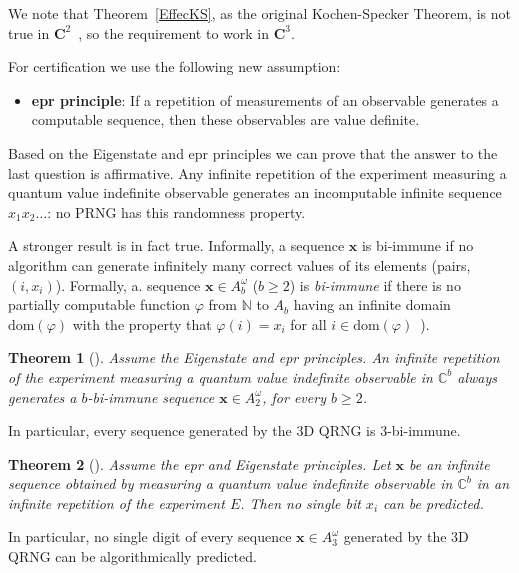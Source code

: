 \documentclass[11pt,a4paper]{article}
\newtheorem{theorem}{Theorem}
\newcommand{\bbbn}{\mathbb{N}}
\newcommand{\dom}{\mathrm{dom}}
\newcommand{\x}{\mathbf{x}}
\begin{document}
We note that Theorem~\ref{EffecKS}, as the original Kochen-Specker Theorem, is not true in ${\mathbf C}^2$~\cite{kochen1}, so the requirement to work in ${\mathbf C}^3$.

For certification we use the following new assumption:


\begin{itemize}
        \item  {\bf epr  principle}: If a repetition of measurements of an
observable generates a computable sequence, then  these observables
are value definite.
\end{itemize}

Based on  the  Eigenstate and epr    principles we can prove that the answer to the last question is affirmative. Any infinite repetition of the
experiment
measuring  a quantum value indefinite observable generates an
incomputable   infinite sequence $x_1x_2\dots$: no PRNG has this randomness property.


A stronger result is in fact true. Informally, a sequence $ \mathbf{x}$ is bi-immune if  no algorithm can generate
infinitely many correct values of its elements (pairs, $(i, x_i)$).
Formally, a.
 sequence $ \mathbf{x}\in A_{b}^{\omega}$  ($b\ge 2$)
 is  {\it bi-immune} if there is no
partially computable function $\varphi$ from $\bbbn $ to $A_{b}$ having an
infinite domain $\dom(\varphi)$ with the property that $\varphi(i)= x_i$ for
all $i\in \dom(\varphi)$~\cite{bienvenu2013}).


\begin{theorem}[\cite{abbott2012strongrandomness,aguero_trejo_new_2021}]
\label{biimm_2}
Assume the  Eigenstate and epr    principles. An infinite repetition of the
experiment
measuring  a quantum value indefinite observable  in $\mathbb{C}^{b}$ always generates a
 $b$-bi-immune   sequence $\x\in A_2^{\omega}$, for every $b\ge 2$.
\end{theorem}

In particular, every sequence generated by the 3D QRNG is 3-bi-immune.

\begin{theorem}  [\cite{aguero_trejo_new_2021}]
\label{bunpredict}
Assume the epr and Eigenstate  principles.
Let $\x$ be an infinite sequence obtained by measuring  a quantum value indefinite observable  in $\mathbb{C}^{b}$  in an infinite repetition of the experiment $E$. Then no single bit $x_i$ can be predicted.
\end{theorem}

In particular, no single digit of every  sequence   $\x \in A_3^{\omega}$ generated by the 3D QRNG  can be algorithmically predicted.
\end{document}
